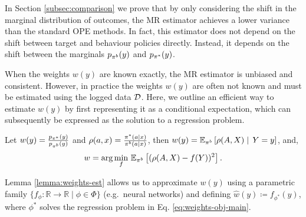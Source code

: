 In Section \ref{subsec:comparison} we prove that by only considering the shift in the marginal distribution of outcomes, the MR estimator achieves a lower variance than the standard OPE methods. In fact, this estimator does not depend on the shift between target and behaviour policies directly. Instead, it depends on the shift between the marginals $p_{\pi^b}(y)$ and $p_{\pi^*}(y)$.

 When the weights $w(y)$ are known exactly, the MR estimator is unbiased and consistent. However, in practice the weights $w(y)$ are often not known and must be estimated using the logged data $\mathcal{D}$. Here, we outline an efficient way to estimate $w(y)$ by first representing it as a conditional expectation, which can subsequently be expressed as the solution to a regression problem.
\begin{lemma}\label{lemma:weights-est}
Let $w(y)=\frac{p_{\pi^*}(y)}{p_{\pi^b}(y)}$ and $\rho(a, x) = \frac{\pi^*(a\mid x)}{\pi^b(a\mid x)}$, then $w(y) = \mathbb{E}_{\pi^b}\left[ \rho(A, X) \mid \,Y=y \right]$, and,
\begin{align}
 w = \arg\min_{f} \, \mathbb{E}_{\pi^b} \left[(\rho(A, X)-f(Y))^2\right]. \label{eq:weights-obj-main}
\end{align}
\end{lemma}
Lemma \ref{lemma:weights-est} allows us to approximate $w(y)$ using a parametric family $\{f_\phi: \mathbb{R}\rightarrow \mathbb{R} \mid \phi \in \Phi\}$ (e.g.\ neural networks) and defining $\hat{w}(y)\coloneqq f_{\phi^*}(y)$, where $\phi^*$ solves the regression problem in Eq. \eqref{eq:weights-obj-main}. 


